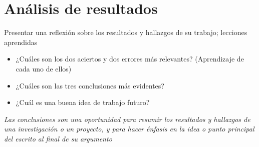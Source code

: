 \section{Análisis de resultados}

\begin{tcolorbox}[colback=yellow!10!white,colframe=red!75!black,title=Recomendaciones]
Presentar una reflexión sobre los resultados y hallazgos de su trabajo; lecciones aprendidas
  \begin{itemize}
      \item ¿Cuáles son los dos aciertos y dos errores más relevantes? (Aprendizaje de cada uno de ellos)
      \item ¿Cuáles son las tres conclusiones más evidentes?
      \item ¿Cuál es una buena idea de trabajo futuro?
  \end{itemize}
  
  \textit{Las conclusiones son una oportunidad para resumir los resultados y hallazgos de una investigación o un proyecto, y para hacer énfasis en la idea o punto principal del escrito al final de su argumento}
\end{tcolorbox}

\pagebreak